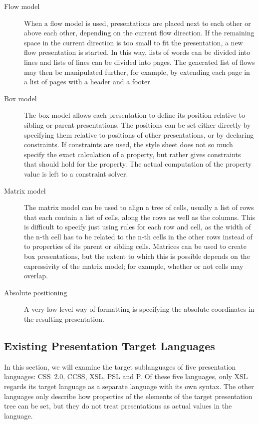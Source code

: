 \begin{description}
\item[Flow model]
When a flow model is used, presentations are placed next to each other or above each other, depending on the current flow direction. If the remaining space in the current direction is too small to fit the presentation, a new flow presentation is started. In this way, lists of words can be divided into lines and lists of lines can be divided into pages. The generated list of flows may then be manipulated further, for example, by extending each page in a list of pages with a header and a footer.
\item[Box model]
The box model allows each presentation to define its position relative to sibling or parent presentations. The positions can be set either directly by specifying them relative to positions of other presentations, or by declaring constraints. If constraints are used, the style sheet does not so much specify the exact calculation of a property, but rather gives constraints that should hold for the property. The actual computation of the property value is left to a constraint solver. 
\item[Matrix model]
The matrix model can be used to align a tree of cells, usually a list of rows that each contain a list of cells, along the rows as well as the columns. This is difficult to specify just using rules for each row and cell, as the width of the n-th cell has to be related to the n-th cells in the other rows instead of to properties of its parent or sibling cells. Matrices can be used to create box presentations, but the extent to which this is possible depends on the expressivity of the matrix model; for example, whether or not cells may overlap.
\item[Absolute positioning]
A very low level way of formatting is specifying the absolute coordinates in the resulting presentation.
\end{description}


%									
\subsection{Existing Presentation Target Languages} \label{existingtarget}

In this section, we will examine the target sublanguages of five presentation languages: CSS~2.0, CCSS, XSL, PSL and P. Of these five languages, only XSL regards its target language as a separate language with its own syntax. The other languages only describe how properties of the elements of the target presentation tree can be set, but they do not treat presentations as actual values in the language.

